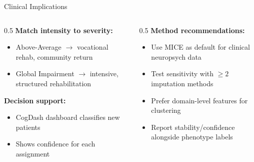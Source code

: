 \documentclass[aspectratio=169, 11pt]{beamer}
\begin{document}
\begin{frame}{Clinical Implications}
  \begin{columns}[T]
    \begin{column}{0.5\textwidth}
      \textbf{Match intensity to severity:}
      \begin{itemize}
        \item Above-Average $\to$ vocational rehab, community return
        \item Global Impairment $\to$ intensive, structured rehabilitation
      \end{itemize}

      \vspace{0.5em}
      \textbf{Decision support:}
      \begin{itemize}
        \item CogDash dashboard classifies new patients
        \item Shows confidence for each assignment
      \end{itemize}
    \end{column}
    \begin{column}{0.5\textwidth}
      \textbf{Method recommendations:}
      \begin{itemize}
        \item Use MICE as default for clinical neuropsych data
        \item Test sensitivity with $\geq 2$ imputation methods
        \item Prefer domain-level features for clustering
        \item Report stability/confidence alongside phenotype labels
      \end{itemize}
    \end{column}
  \end{columns}
\end{frame}
\end{document}

